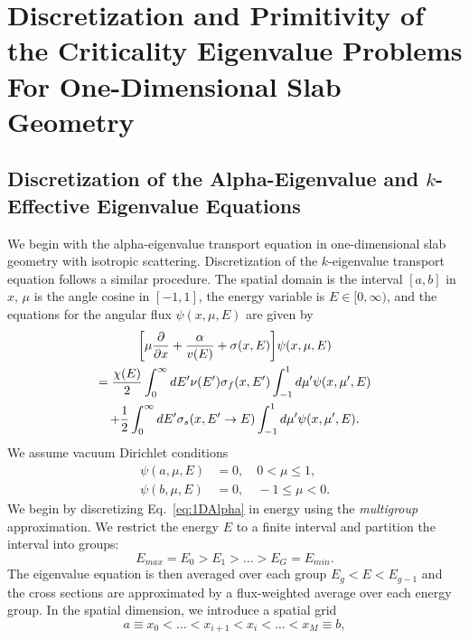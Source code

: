 \chapter{Discretization and Primitivity of the Criticality Eigenvalue Problems For One-Dimensional Slab Geometry}

\label{Discrete}

\section{Discretization of the Alpha-Eigenvalue and $k$-Effective Eigenvalue Equations}

We begin with the alpha-eigenvalue transport equation in one-dimensional slab geometry with isotropic scattering. Discretization of the $k$-eigenvalue transport equation follows a similar procedure. The spatial domain is the interval $[a,b]$ in $x$, $\mu$ is the angle cosine in $[-1,1]$, the energy variable is $E \in [0, \infty)$, and the equations for the angular flux $\psi(x, \mu, E)$ are given by
\begin{multline}
\bigg [ \mu \frac{\partial}{\partial x} + \frac{\alpha}{v(E)} + \sigma(x,E) \bigg ] \psi(x,\mu,E) \\ = \frac{\chi(E)}{2} \int_{0}^{\infty} \mathop{}\!d E' \nu(E') \sigma_{f}(x,E') \int_{-1}^{1} \mathop{}\!d \mu' \psi(x,\mu',E) \\ + \frac{1}{2} \int_{0}^{\infty} \mathop{}\!d E' \sigma_{s}(x, E' \rightarrow E) \int_{-1}^{1} \mathop{}\!d \mu' \psi(x,\mu',E).
\label{eq:1DAlpha}
\end{multline}
We assume vacuum Dirichlet conditions
\begin{align*}
	\psi(a, \mu, E) &=0, \quad 0 < \mu \leq 1, \\
        \psi(b, \mu, E) &=0, \quad -1 \leq \mu < 0.
\end{align*}
We begin by discretizing Eq.~\ref{eq:1DAlpha} in energy using the \textit{multigroup} approximation. We restrict the energy $E$ to a finite interval and partition the interval into groups:
\begin{equation*}
	E_{max} = E_{0} > E_{1} > \dots > E_{G} = E_{min}.
\end{equation*}
The eigenvalue equation is then averaged over each group $E_{g} < E < E_{g-1}$ and the cross sections are approximated by a flux-weighted average over each energy group. In the spatial dimension, we introduce a spatial grid
\begin{equation*}
	a \equiv x_{0} < \dots < x_{i+1} < x_{i} < \dots < x_{M} \equiv b,
\end{equation*}
